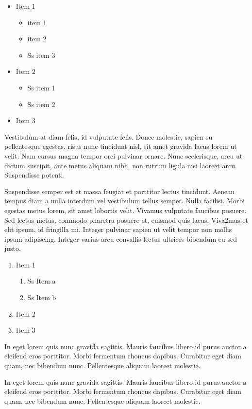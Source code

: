 \documentclass[year=2013]{jres}
\begin{document}
\begin{itemize}
  \item Item 1
  \begin{itemize}
    \item item 1
    \item item 2
    \item Ss item 3
  \end{itemize}
  \item Item 2
  \begin{itemize}
    \item Ss item 1
    \item Ss item 2
  \end{itemize}
  \item Item 3
\end{itemize}

Vestibulum at diam felis, id vulputate felis. Donec molestie, sapien eu pellentesque egestas, risus nunc tincidunt nisl, sit amet gravida lacus lorem ut velit. Nam cursus magna tempor orci pulvinar ornare. Nunc scelerisque, arcu ut dictum suscipit, ante metus aliquam nibh, non rutrum ligula nisi laoreet arcu. Suspendisse potenti. 

Suspendisse semper est et massa feugiat et porttitor lectus tincidunt. Aenean tempus diam a nulla interdum vel vestibulum tellus semper. Nulla facilisi. Morbi egestas metus lorem, sit amet lobortis velit. Vivamus vulputate faucibus posuere. Sed lectus metus, commodo pharetra posuere et, euismod quis lacus. Viva2mus et elit ipsum, id fringilla mi. Integer pulvinar sapien ut velit tempor non mollis ipsum adipiscing. Integer varius arcu convallis lectus ultrices bibendum eu sed justo. 

\begin{enumerate}
  \item Item 1
  \begin{enumerate}
    \item Ss Item a
    \item Ss Item b
  \end{enumerate}
  \item Item 2
  \item Item 3
\end{enumerate}

In eget lorem quis nunc gravida sagittis. Mauris faucibus libero id purus auctor a eleifend eros porttitor. Morbi fermentum rhoncus dapibus. Curabitur eget diam quam, nec bibendum nunc. Pellentesque aliquam laoreet molestie. 

In eget lorem quis nunc gravida sagittis. Mauris faucibus libero id purus auctor a eleifend eros porttitor. Morbi fermentum rhoncus dapibus. Curabitur eget diam quam, nec bibendum nunc. Pellentesque aliquam laoreet molestie. 
\end{document}
